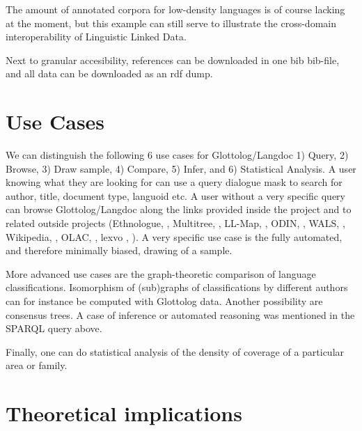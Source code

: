\documentclass[10pt, a4paper]{article}
\begin{document}
The amount of annotated corpora for low-density languages is of course lacking at the moment, but this example can still serve to illustrate the cross-domain interoperability of Linguistic Linked Data.

Next to granular accesibility, references can be downloaded in one bib bib-file, and all data can be downloaded as an rdf dump.

\section{Use Cases}
We can distinguish the following 6 use cases for Glottolog/Langdoc
1)  Query,
2) Browse,
3)  Draw sample,
4)  Compare,
5)  Infer, and
6)  Statistical Analysis.
A user knowing what they are looking for can use a query dialogue mask to search for author, title, document type, languoid etc. A user without a very specific query can browse Glottolog/Langdoc along the links provided inside the project and to related outside projects (Ethnologue, \url{} \cite{}, 
Multitree, \url{} \cite{}, 
LL-Map, \url{} \cite{}, 
ODIN, \url{} \cite{}, 
WALS, \url{} \cite{}, 
Wikipedia, \url{},
OLAC, \url{} \cite{},
lexvo , \url{} \cite{}). 
A very specific use case is the fully automated, and therefore minimally biased, drawing of a sample. 

More advanced use cases are the graph-theoretic comparison of language classifications. Isomorphism of (sub)graphs of classifications by different authors can for instance be computed with Glottolog data. Another possibility are consensus trees. A case of inference or automated reasoning was mentioned in the SPARQL query above. 
 


Finally, one can do statistical analysis of the density of coverage of a particular area or family. 



\section{Theoretical implications}
\end{document}
